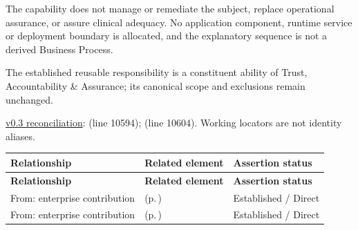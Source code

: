 \par\smallskip


The capability does not manage or remediate the subject, replace operational assurance, or assure clinical adequacy. No application component, runtime service or deployment boundary is allocated, and the explanatory sequence is not a derived Business Process.



The established reusable responsibility is a constituent ability of Trust, Accountability \& Assurance; its canonical scope and exclusions remain unchanged.


\hyperref[model:reconciliation]{v0.3 reconciliation}: \texttt{} (line 10594); \texttt{} (line 10604). Working locators are not identity aliases.
\begingroup\small\setlength{\TableWidth}{\dimexpr\linewidth-6\tabcolsep-4\arrayrulewidth\relax}
\begin{longtable}{|>{\raggedright\arraybackslash}p{0.27\TableWidth}|>{\raggedright\arraybackslash}p{0.48\TableWidth}|>{\raggedright\arraybackslash}p{0.25\TableWidth}|}
\hline\rowcolor{TableHead}\textbf{Relationship} & \textbf{Related element} & \textbf{Assertion status}\\\hline\endfirsthead
\hline\rowcolor{TableHead}\textbf{Relationship} & \textbf{Related element} & \textbf{Assertion status}\\\hline\endhead
\hline\endfoot
From: enterprise contribution & \nameref{cap:bec-assurance-design} (p.\,\pageref{cap:bec-assurance-design}) & Established / Direct\\\hline
From: enterprise contribution & \nameref{cap:bec-assurance-criteria-management} (p.\,\pageref{cap:bec-assurance-criteria-management}) & Established / Direct\\\hline
\end{longtable}\endgroup

